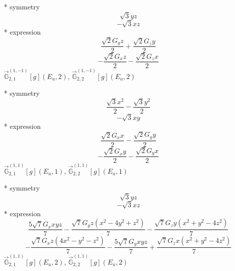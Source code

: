 \documentclass[fleqn,8pt]{jsarticle}
\begin{document}
\noindent\quad ** symmetry
\begin{dmath*}
\sqrt{3} y z
\end{dmath*}
\begin{dmath*}
- \sqrt{3} x z
\end{dmath*}
\noindent\quad ** expression
\begin{dmath*}
\frac{\sqrt{2} G_{y} z}{2} + \frac{\sqrt{2} G_{z} y}{2}
\end{dmath*}
\begin{dmath*}
- \frac{\sqrt{2} G_{x} z}{2} - \frac{\sqrt{2} G_{z} x}{2}
\end{dmath*}
\noindent\quad $\vec{\mathbb{G}}_{2,1}^{(1,-1)}[g](E_{u},2)$, $\vec{\mathbb{G}}_{2,2}^{(1,-1)}[g](E_{u},2)$

\noindent\quad ** symmetry
\begin{dmath*}
\frac{\sqrt{3} x^{2}}{2} - \frac{\sqrt{3} y^{2}}{2}
\end{dmath*}
\begin{dmath*}
- \sqrt{3} x y
\end{dmath*}
\noindent\quad ** expression
\begin{dmath*}
\frac{\sqrt{2} G_{x} x}{2} - \frac{\sqrt{2} G_{y} y}{2}
\end{dmath*}
\begin{dmath*}
- \frac{\sqrt{2} G_{x} y}{2} - \frac{\sqrt{2} G_{y} x}{2}
\end{dmath*}
\noindent\quad $\vec{\mathbb{G}}_{2,1}^{(1,1)}[g](E_{u},1)$, $\vec{\mathbb{G}}_{2,2}^{(1,1)}[g](E_{u},1)$

\noindent\quad ** symmetry
\begin{dmath*}
\sqrt{3} y z
\end{dmath*}
\begin{dmath*}
- \sqrt{3} x z
\end{dmath*}
\noindent\quad ** expression
\begin{dmath*}
\frac{5 \sqrt{7} G_{x} x y z}{7} - \frac{\sqrt{7} G_{y} z \left(x^{2} - 4 y^{2} + z^{2}\right)}{7} - \frac{\sqrt{7} G_{z} y \left(x^{2} + y^{2} - 4 z^{2}\right)}{7}
\end{dmath*}
\begin{dmath*}
- \frac{\sqrt{7} G_{x} z \left(4 x^{2} - y^{2} - z^{2}\right)}{7} - \frac{5 \sqrt{7} G_{y} x y z}{7} + \frac{\sqrt{7} G_{z} x \left(x^{2} + y^{2} - 4 z^{2}\right)}{7}
\end{dmath*}
\noindent\quad $\vec{\mathbb{G}}_{2,1}^{(1,1)}[g](E_{u},2)$, $\vec{\mathbb{G}}_{2,2}^{(1,1)}[g](E_{u},2)$
\end{document}
